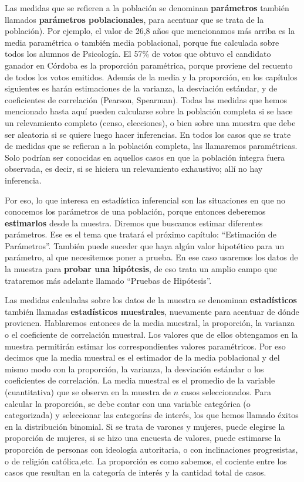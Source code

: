 \documentclass[]{book}
\begin{document}
Las medidas que se refieren a la población se denominan \textbf{parámetros}
también llamados \textbf{parámetros poblacionales}, para acentuar que se
trata de la población). Por ejemplo, el valor de 26,8 años que
mencionamos más arriba es la media paramétrica o también media
poblacional, porque fue calculada sobre todos los alumnos de Psicología. El 57\% de votos que obtuvo el candidato ganador en Córdoba es la proporción paramétrica, porque proviene del recuento de todos los votos emitidos.
Además de la media y la proporción, en los capítulos siguientes es harán estimaciones de la varianza, la desviación estándar, y de coeficientes de correlación (Pearson, Spearman). Todas las medidas que hemos mencionado hasta aquí pueden calcularse sobre la población completa si se hace un relevamiento completo (censo, elecciones), o bien sobre una muestra que debe ser aleatoria si se quiere luego hacer inferencias. En todos los casos que se trate de medidas que se refieran a la población completa, las llamaremos paramétricas. Solo podrían ser conocidas en aquellos casos en que la población íntegra fuera observada, es decir, si se hiciera un relevamiento exhaustivo; allí no hay inferencia.

Por eso, lo que interesa en estadística inferencial son las situaciones en que no conocemos los parámetros de una población, porque entonces deberemos \textbf{estimarlos} desde la muestra. Diremos que buscamos estimar diferentes parámetros. Ese es el tema que tratará el próximo capítulo: ``Estimación de Parámetros''. También puede suceder que haya algún valor hipotético para un parámetro, al que necesitemos poner a prueba. En ese caso usaremos los datos de la muestra para \textbf{probar una hipótesis}, de eso trata un amplio campo que trataremos más adelante llamado ``Pruebas de Hipótesis''.

Las medidas calculadas sobre los datos de la muestra se denominan
\textbf{estadísticos} también llamadas \textbf{estadísticos muestrales},
nuevamente para acentuar de dónde provienen. Hablaremos entonces de la
media muestral, la proporción, la varianza o el coeficiente de
correlación muestral. Los valores que de ellos obtengamos en la muestra
permitirán estimar los correspondientes valores paramétricos. Por eso
decimos que la media muestral es el estimador de la media poblacional y
del mismo modo con la proporción, la varianza, la desviación estándar o
los coeficientes de correlación. La media muestral es el promedio de la
variable (cuantitativa) que se observa en la muestra de \(n\) casos
seleccionados. Para calcular la proporción, se debe contar con una
variable categórica (o categorizada) y seleccionar las categorías de
interés, los que hemos llamado éxitos en la distribución binomial. Si se trata de varones y mujeres, puede elegirse la proporción de mujeres, si se hizo una encuesta de valores, puede estimarse la proporción de personas con ideología autoritaria, o con inclinaciones progresistas, o de religión católica,etc.
La proporción es como sabemos, el cociente entre los casos que resultan
en la categoría de interés y la cantidad total de casos.
\end{document}

